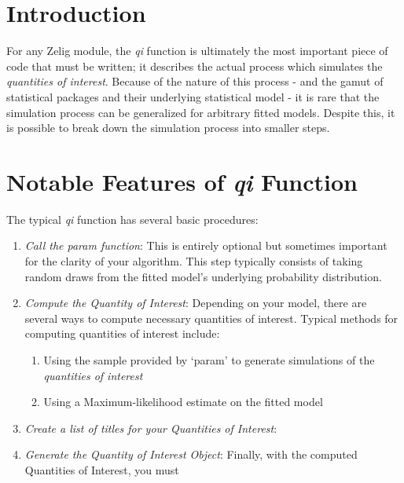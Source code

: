 \section{Introduction}

For any Zelig module, the \emph{qi} function is ultimately the most
important piece of code that must be written; it describes the actual
process which simulates the \emph{quantities of interest}.  Because of
the nature of this process - and the gamut of statistical packages and
their underlying statistical model - it is rare that the simulation
process can be generalized for arbitrary fitted models.  Despite this,
it is possible to break down the simulation process into smaller steps.


%
%
\section{Notable Features of \emph{qi} Function}

The typical \emph{qi} function has several basic procedures:

\begin{enumerate}

	\item \emph{Call the param function}:  This is entirely optional but
		sometimes important for the clarity of your algorithm.  This step
		typically consists of taking random draws from the fitted model's
		underlying probability distribution.
		
	\item \emph{Compute the Quantity of Interest}: Depending on your model,
		there are several ways to compute necessary quantities of interest.
		Typical methods for computing quantities of interest include:
		\begin{enumerate}
			
			\item Using the sample provided by `param' to generate simulations
				of the \emph{quantities of interest}
			
			\item Using a Maximum-likelihood estimate on the fitted model
			
		\end{enumerate}
		
	\item \emph{Create a list of titles for your Quantities of Interest}: 
	
	\item \emph{Generate the Quantity of Interest Object}: Finally, with the
		computed Quantities of Interest, you must
		
\end{enumerate}


